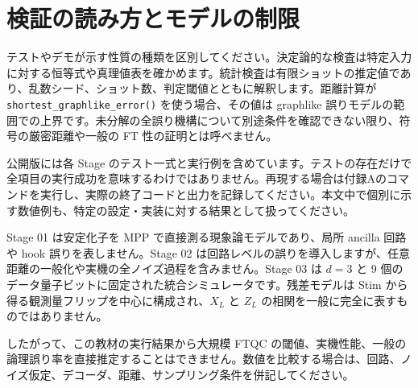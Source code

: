 \chapter{検証の読み方とモデルの制限}\label{app:validation}

テストやデモが示す性質の種類を区別してください。決定論的な検査は特定入力に対する恒等式や真理値表を確かめます。統計検査は有限ショットの推定値であり、乱数シード、ショット数、判定閾値とともに解釈します。距離計算が \texttt{shortest\_graphlike\_error()} を使う場合、その値は graphlike 誤りモデルの範囲での上界です。未分解の全誤り機構について別途条件を確認できない限り、符号の厳密距離や一般の FT 性の証明とは呼べません。

公開版には各 Stage のテスト一式と実行例を含めています。テストの存在だけで全項目の実行成功を意味するわけではありません。再現する場合は付録Aのコマンドを実行し、実際の終了コードと出力を記録してください。本文中で個別に示す数値例も、特定の設定・実装に対する結果として扱ってください。

Stage 01 は安定化子を MPP で直接測る現象論モデルであり、局所 ancilla 回路や hook 誤りを表しません。Stage 02 は回路レベルの誤りを導入しますが、任意距離の一般化や実機の全ノイズ過程を含みません。Stage 03 は $d=3$ と 9 個のデータ量子ビットに固定された統合シミュレータです。残差モデルは Stim から得る観測量フリップを中心に構成され、$X_L$ と $Z_L$ の相関を一般に完全に表すものではありません。

したがって、この教材の実行結果から大規模 FTQC の閾値、実機性能、一般の論理誤り率を直接推定することはできません。数値を比較する場合は、回路、ノイズ仮定、デコーダ、距離、サンプリング条件を併記してください。
